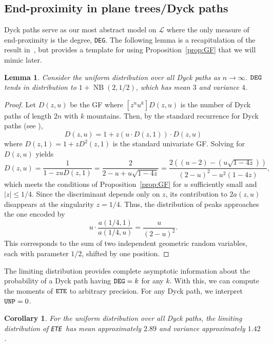\documentclass{article}
\DeclareMathOperator{\NB}{NB}
\newtheorem{lem}[theorem]{Lemma}
\newtheorem{cor}[theorem]{Corollary}
\newcommand{\DEG}{{\tt DEG}}
\newcommand{\UNP}{{\tt UNP}}
\newcommand{\ETE}{{\tt ETE}}
\begin{document}
\subsection{End-proximity in plane trees/Dyck paths} \label{sec:Plane}

Dyck paths serve as our most abstract model on $\mathcal{L}$ where the only measure of end-proximity is the degree, {\tt DEG}.  The following lemma is a recapitulation of the result in~\cite[Example IX.8]{FlSe:2009}, but provides a template for using Proposition~\ref{prop:GF} that we will mimic later.

\begin{lem} \label{lem:DyckDegree}
Consider the uniform distribution over all Dyck paths as $n \to \infty$.  ${\tt DEG}$ tends in distribution to $1 + \NB(2, 1/2)$, which has mean $3$ and variance $4$.
\end{lem}



\begin{proof}
    Let $D(z, u)$ be the GF where $[z^n u^k] D(z, u)$ is 
the number of Dyck paths of length $2n$ with $k$ mountains.  Then, by the standard recurrence for Dyck paths (see ),
    \[
    D(z, u) = 1 + z (u \cdot D(z, 1)) \cdot D(z, u)
    \]
where $D(z, 1) = 1 + zD^2(z,1)$ is the standard univariate GF.
Solving for $D(z, u)$ yields
    \[
    D(z, u) = \frac{1}{1 - zuD(z, 1)} = \frac{2}{2 - u + u\sqrt{1 - 4z}} = \frac{2((u - 2) - (u\sqrt{1 - 4z}))}{(2 - u)^2 - u^2(1-4z)},
    \]
   which meets the conditions of Proposition~\ref{prop:GF} for $u$ sufficiently small and $|z| \leq 1/4$.  
Since the discriminant depends only on $z$, its contribution to $2a(z,u)$ 
disappears at the singularity $z = 1/4$.  
Thus, the distribution of peaks approaches the one encoded by 
    \[
    u \cdot \frac{a(1/4, 1)}{a(1/4, u)} = \frac{u}{(2-u)^2}.
    \]
This corresponds to the sum of two independent 
geometric random variables, each with parameter $1/2$, shifted by 
one position.
\end{proof}

The limiting distribution provides complete asymptotic information about the probability of a Dyck path having $\DEG = k$ for any $k$.  With this, we can compute the moments of $\ETE$ to arbitrary precision.  For any Dyck path, we interpret $\UNP = 0$.

\begin{cor}\label{cor:DyckETE}
    For the uniform distribution over all Dyck paths, the limiting distribution of \ETE\ has mean approximately $2.89$ and variance approximately $1.42$.
\end{cor}
\end{document}
